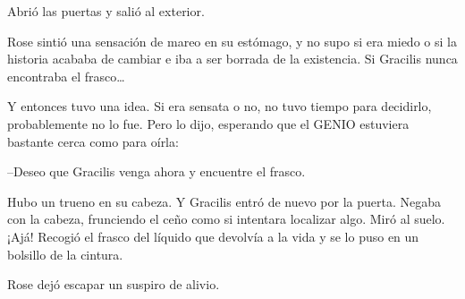 Abrió las puertas y salió al exterior.

Rose sintió una sensación de mareo en su estómago, y no supo si era
miedo o si la historia acababa de cambiar e iba a ser borrada de la
existencia. Si Gracilis nunca encontraba el frasco\ldots{}

Y entonces tuvo una idea. Si era sensata o no, no tuvo tiempo para
decidirlo, probablemente no lo fue. Pero lo dijo, esperando que el GENIO
estuviera bastante cerca como para oírla:

--Deseo que Gracilis venga ahora y encuentre el frasco.

Hubo un trueno en su cabeza. Y Gracilis entró de nuevo por la puerta.
Negaba con la cabeza, frunciendo el ceño como si intentara localizar
algo. Miró al suelo. ¡Ajá! Recogió el frasco del líquido que devolvía a
la vida y se lo puso en un bolsillo de la cintura.

Rose dejó escapar un suspiro de alivio.
